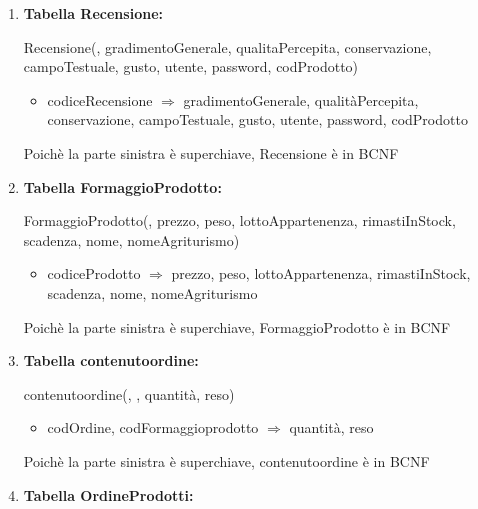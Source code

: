\documentclass[12pt,a4paper]{article}
\begin{document}
\begin{enumerate}
\item[] \textbf{Tabella Recensione:}

Recensione(\underline{}, gradimentoGenerale, qualitaPercepita, conservazione, campoTestuale, gusto, utente,  password,  codProdotto)
\begin{itemize}
\vspace{-5pt}
\item codiceRecensione $\Rightarrow$ gradimentoGenerale, qualitàPercepita, conservazione, campoTestuale, gusto, utente, password, codProdotto
\vspace{-5pt}
\end{itemize}
Poichè la parte sinistra è superchiave, Recensione è in BCNF
\vspace{10pt}



\item[] \textbf{Tabella FormaggioProdotto:}

FormaggioProdotto(\underline{}, prezzo, peso, lottoAppartenenza, rimastiInStock, scadenza,  nome,  nomeAgriturismo)
\begin{itemize}
\vspace{-5pt}
\item codiceProdotto $\Rightarrow$ prezzo, peso, lottoAppartenenza, rimastiInStock, scadenza, nome, nomeAgriturismo
\vspace{-5pt}
\end{itemize}
Poichè la parte sinistra è superchiave, FormaggioProdotto è in BCNF
\vspace{10pt}



\item[] \textbf{Tabella contenutoordine:}

contenutoordine(\underline{}, \underline{}, quantità, reso)
\begin{itemize}
\vspace{-5pt}
\item codOrdine, codFormaggioprodotto $\Rightarrow$ quantità, reso
\vspace{-5pt}
\end{itemize}
Poichè la parte sinistra è superchiave, contenutoordine è in BCNF
\vspace{10pt}



\item[] \textbf{Tabella OrdineProdotti:}


\end{enumerate}
\end{document}
